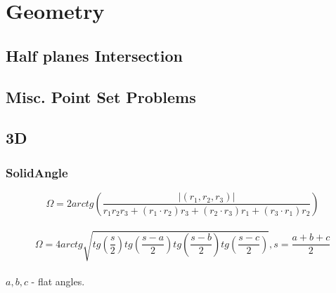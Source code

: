 \chapter{Geometry}

\section{Half planes Intersection}

	\section{Misc. Point Set Problems}

\section{3D}
	
	\subsection{SolidAngle}
		$$\Omega = 2 arctg \left(\dfrac{|(r_1, r_2, r_3)|}{r_1r_2r_3+(r_1 \cdot r_2)r_3+(r_2 \cdot r_3)r_1 + (r_3 \cdot r_1)r_2} \right)$$\\
		$$\Omega = 4 arctg \sqrt{tg(\frac{s}{2}) tg(\frac{s-a}{2}) tg (\frac{s-b}{2}) tg (\frac{s - c}{2})}, s = \frac{a+b+c}{2}$$\\
		$a, b, c$ - flat angles.
